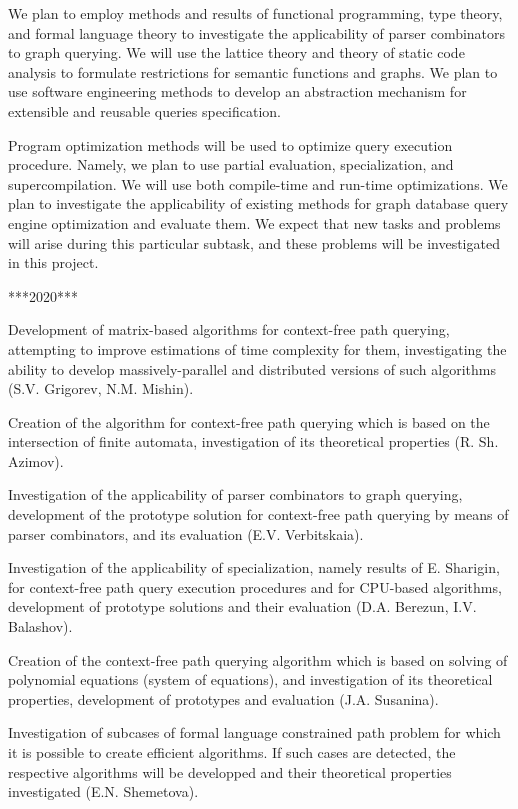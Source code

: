 \documentclass[12pt]{article}  %
\theoremstyle{remark}
\begin{document}
We plan to employ methods and results of functional programming, type theory, and formal language theory to investigate the applicability of parser combinators to graph querying.
We will use the lattice theory and theory of static code analysis to formulate restrictions for semantic functions and graphs.
We plan to use software engineering methods to develop an abstraction mechanism for extensible and reusable queries specification.

Program optimization methods will be used to optimize query execution procedure.
Namely, we plan to use partial evaluation, specialization, and supercompilation. 
We will use both compile-time and run-time optimizations. 
We plan to investigate the applicability of existing methods for graph database query engine optimization and evaluate them. 
We expect that new tasks and problems will arise during this particular subtask, and these problems will be investigated in this project.

***2020***

Development of matrix-based algorithms for context-free path querying, attempting to improve estimations of time complexity for them, investigating the ability to develop massively-parallel and distributed versions of such algorithms (S.V. Grigorev, N.M. Mishin).

Creation of the algorithm for context-free path querying which is based on the intersection of finite automata, investigation of its theoretical properties (R. Sh. Azimov).

Investigation of the applicability of parser combinators to graph querying, development of the prototype solution for context-free path querying by means of parser combinators, and its evaluation (E.V. Verbitskaia).

Investigation of the applicability of specialization, namely results of E. Sharigin, for context-free path query execution procedures and for CPU-based algorithms, development of  prototype solutions and their evaluation (D.A. Berezun, I.V. Balashov).

Creation of the context-free path querying algorithm which is based on solving of polynomial equations (system of equations), and investigation of its theoretical properties, development of  prototypes and evaluation (J.A. Susanina).

Investigation of subcases of formal language constrained path problem for which it is possible to create efficient algorithms. 
If such cases are detected, the respective algorithms will be developped and their theoretical properties investigated (E.N. Shemetova).
\end{document}
